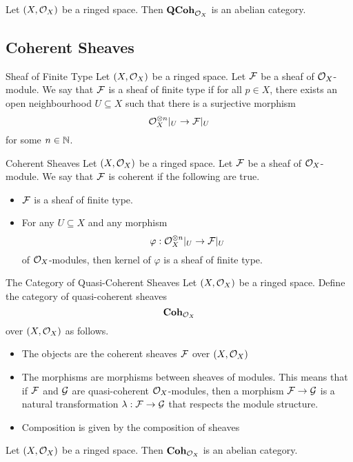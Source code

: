 \documentclass[a4paper]{article}
\begin{document}
\begin{thm}{}{} Let $(X,\mathcal{O}_X)$ be a ringed space. Then $\bold{QCoh}_{\mathcal{O}_X}$ is an abelian category. 
\end{thm}

\subsection{Coherent Sheaves}
\begin{defn}{Sheaf of Finite Type}{}  Let $(X,\mathcal{O}_X)$ be a ringed space. Let $\mathcal{F}$ be a sheaf of $\mathcal{O}_X$-module. We say that $\mathcal{F}$ is a sheaf of finite type if for all $p\in X$, there exists an open neighbourhood $U\subseteq X$ such that there is a surjective morphism $$\mathcal{O}_X^{\otimes n}|_U\to\mathcal{F}|_U$$ for some $n\in\mathbb{N}$. 
\end{defn}

\begin{defn}{Coherent Sheaves}{} Let $(X,\mathcal{O}_X)$ be a ringed space. Let $\mathcal{F}$ be a sheaf of $\mathcal{O}_X$-module. We say that $\mathcal{F}$ is coherent if the following are true. 
\begin{itemize}
\item $\mathcal{F}$ is a sheaf of finite type. 
\item For any $U\subseteq X$ and any morphism $$\varphi:\mathcal{O}_X^{\otimes n}|_U\to\mathcal{F}|_U$$ of $\mathcal{O}_X$-modules, then kernel of $\varphi$ is a sheaf of finite type. 
\end{itemize}
\end{defn}

\begin{defn}{The Category of Quasi-Coherent Sheaves}{} Let $(X,\mathcal{O}_X)$ be a ringed space. Define the category of quasi-coherent sheaves $$\bold{Coh}_{\mathcal{O}_X}$$ over $(X,\mathcal{O}_X)$ as follows. 
\begin{itemize}
\item The objects are the coherent sheaves $\mathcal{F}$ over $(X,\mathcal{O}_X)$
\item The morphisms are morphisms between sheaves of modules. This means that if $\mathcal{F}$ and $\mathcal{G}$ are quasi-coherent $\mathcal{O}_X$-modules, then a morphism $\mathcal{F}\to\mathcal{G}$ is a natural transformation $\lambda:\mathcal{F}\to\mathcal{G}$ that respects the module structure. 
\item Composition is given by the composition of sheaves
\end{itemize}
\end{defn}

\begin{thm}{}{} Let $(X,\mathcal{O}_X)$ be a ringed space. Then $\bold{Coh}_{\mathcal{O}_X}$ is an abelian category. 
\end{thm}
\end{document}
